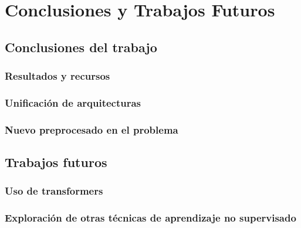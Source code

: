 \chapter{Conclusiones y Trabajos Futuros}

\section{Conclusiones del trabajo}

\subsection{Resultados y recursos}

\subsection{Unificación de arquitecturas}

\subsection{Nuevo preprocesado en el problema}

\section{Trabajos futuros}

\subsection{Uso de transformers}

\subsection{Exploración de otras técnicas de aprendizaje no supervisado}